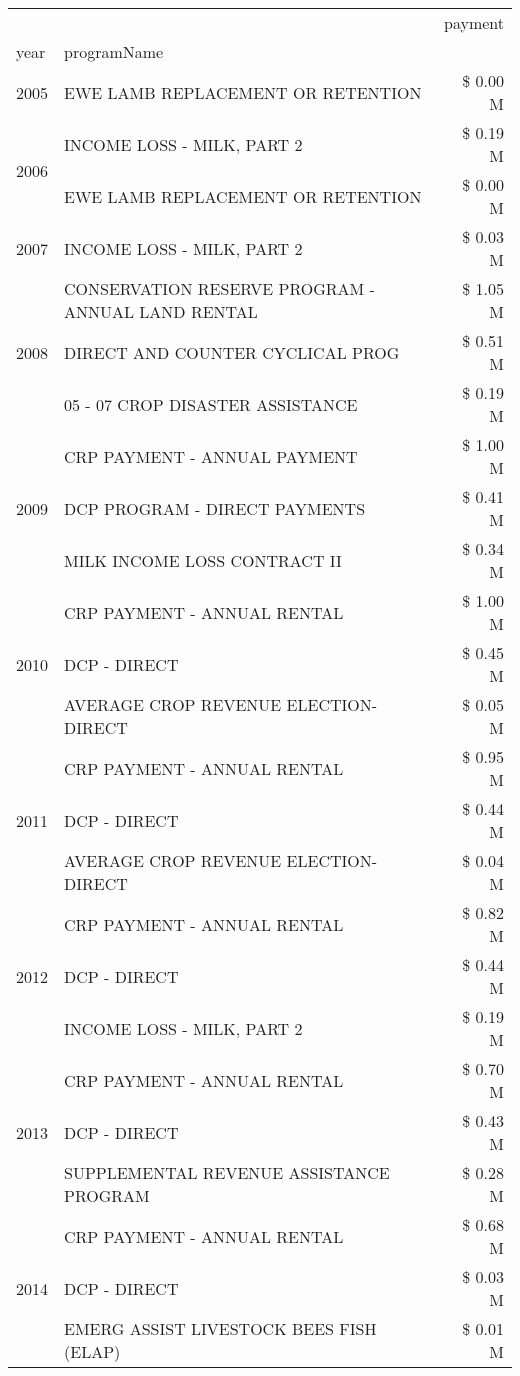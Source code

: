\begin{tabular}{llr}
\toprule
 &  & payment \\
year & programName &  \\
\midrule
2005 & EWE LAMB REPLACEMENT OR RETENTION & \$ 0.00 M \\
\cline{1-3}
\multirow[t]{2}{*}{2006} & INCOME LOSS - MILK, PART 2 & \$ 0.19 M \\
 & EWE LAMB REPLACEMENT OR RETENTION & \$ 0.00 M \\
\cline{1-3}
2007 & INCOME LOSS - MILK, PART 2 & \$ 0.03 M \\
\cline{1-3}
\multirow[t]{3}{*}{2008} & CONSERVATION RESERVE PROGRAM - ANNUAL LAND RENTAL & \$ 1.05 M \\
 & DIRECT AND COUNTER CYCLICAL PROG & \$ 0.51 M \\
 & 05 - 07 CROP DISASTER ASSISTANCE & \$ 0.19 M \\
\cline{1-3}
\multirow[t]{3}{*}{2009} & CRP PAYMENT - ANNUAL PAYMENT & \$ 1.00 M \\
 & DCP PROGRAM - DIRECT PAYMENTS & \$ 0.41 M \\
 & MILK INCOME LOSS CONTRACT II & \$ 0.34 M \\
\cline{1-3}
\multirow[t]{3}{*}{2010} & CRP PAYMENT - ANNUAL RENTAL & \$ 1.00 M \\
 & DCP - DIRECT & \$ 0.45 M \\
 & AVERAGE CROP REVENUE ELECTION-DIRECT & \$ 0.05 M \\
\cline{1-3}
\multirow[t]{3}{*}{2011} & CRP PAYMENT - ANNUAL RENTAL & \$ 0.95 M \\
 & DCP - DIRECT & \$ 0.44 M \\
 & AVERAGE CROP REVENUE ELECTION-DIRECT & \$ 0.04 M \\
\cline{1-3}
\multirow[t]{3}{*}{2012} & CRP PAYMENT - ANNUAL RENTAL & \$ 0.82 M \\
 & DCP - DIRECT & \$ 0.44 M \\
 & INCOME LOSS - MILK, PART 2 & \$ 0.19 M \\
\cline{1-3}
\multirow[t]{3}{*}{2013} & CRP PAYMENT - ANNUAL RENTAL & \$ 0.70 M \\
 & DCP - DIRECT & \$ 0.43 M \\
 & SUPPLEMENTAL REVENUE ASSISTANCE PROGRAM & \$ 0.28 M \\
\cline{1-3}
\multirow[t]{3}{*}{2014} & CRP PAYMENT - ANNUAL RENTAL & \$ 0.68 M \\
 & DCP - DIRECT & \$ 0.03 M \\
 & EMERG ASSIST LIVESTOCK BEES FISH (ELAP) & \$ 0.01 M \\

\end{tabular}
